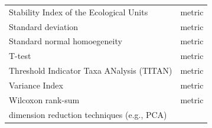 \documentclass[12pt,twoside,openany]{reedthesis}
\begin{document}
\begin{longtable}[]{@{}lc@{}}
\begin{minipage}[t]{0.31\columnwidth}
Stability Index of the Ecological Units\strut
\end{minipage} & \begin{minipage}[t]{0.34\columnwidth}\centering\strut
metric\strut
\end{minipage}\tabularnewline
\begin{minipage}[t]{0.31\columnwidth}\raggedright\strut
Standard deviation\strut
\end{minipage} & \begin{minipage}[t]{0.34\columnwidth}\centering\strut
metric\strut
\end{minipage}\tabularnewline
\begin{minipage}[t]{0.31\columnwidth}\raggedright\strut
Standard normal homoegeneity\strut
\end{minipage} & \begin{minipage}[t]{0.34\columnwidth}\centering\strut
metric\strut
\end{minipage}\tabularnewline
\begin{minipage}[t]{0.31\columnwidth}\raggedright\strut
T-test\strut
\end{minipage} & \begin{minipage}[t]{0.34\columnwidth}\centering\strut
metric\strut
\end{minipage}\tabularnewline
\begin{minipage}[t]{0.31\columnwidth}\raggedright\strut
Threshold Indicator Taxa ANalysis (TITAN)\strut
\end{minipage} & \begin{minipage}[t]{0.34\columnwidth}\centering\strut
metric\strut
\end{minipage}\tabularnewline
\begin{minipage}[t]{0.31\columnwidth}\raggedright\strut
Variance Index\strut
\end{minipage} & \begin{minipage}[t]{0.34\columnwidth}\centering\strut
metric\strut
\end{minipage}\tabularnewline
\begin{minipage}[t]{0.31\columnwidth}\raggedright\strut
Wilcoxon rank-sum\strut
\end{minipage} & \begin{minipage}[t]{0.34\columnwidth}\centering\strut
metric\strut
\end{minipage}\tabularnewline
\begin{minipage}[t]{0.31\columnwidth}\raggedright\strut
dimension reduction techniques (e.g., PCA)\strut
\end{minipage} & \begin{minipage}[t]{0.34\columnwidth}\centering\strut

\end{minipage}
\end{longtable}
\end{document}
